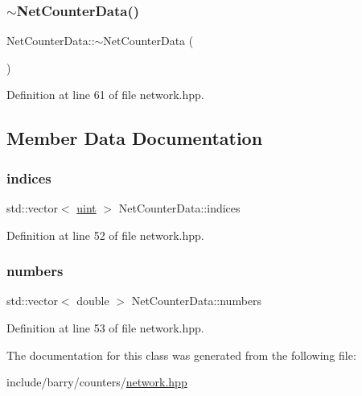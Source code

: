 \mbox{\label{class_net_counter_data_a2e88fcc7f0296d791fe9f0facd24489f}} 
\subsubsection{\texorpdfstring{$\sim$\+Net\+Counter\+Data()}{~NetCounterData()}}
{\footnotesize\ttfamily Net\+Counter\+Data\+::$\sim$\+Net\+Counter\+Data (\begin{DoxyParamCaption}{ }\end{DoxyParamCaption})\hspace{0.3cm}{\ttfamily [inline]}}



Definition at line 61 of file network.\+hpp.



\subsection{Member Data Documentation}
\mbox{\label{class_net_counter_data_ae2f47af99f3fa785d3faac089ab90d83}} 
\subsubsection{\texorpdfstring{indices}{indices}}
{\footnotesize\ttfamily std\+::vector$<$ \hyperlink{typedefs_8hpp_a91ad9478d81a7aaf2593e8d9c3d06a14}{uint} $>$ Net\+Counter\+Data\+::indices}



Definition at line 52 of file network.\+hpp.

\mbox{\label{class_net_counter_data_ad218e01cd14fb4abfbe21d8d92a6cbd3}} 
\subsubsection{\texorpdfstring{numbers}{numbers}}
{\footnotesize\ttfamily std\+::vector$<$ double $>$ Net\+Counter\+Data\+::numbers}



Definition at line 53 of file network.\+hpp.



The documentation for this class was generated from the following file\+:\begin{DoxyCompactItemize}
\item 
include/barry/counters/\hyperlink{network_8hpp}{network.\+hpp}\end{DoxyCompactItemize}
